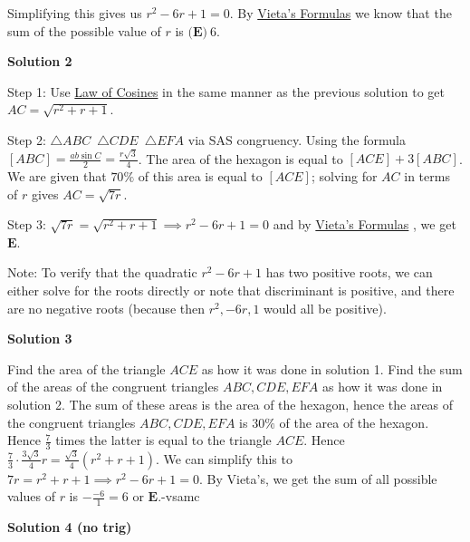 \begin{enumerate}
 Simplifying this gives us $r^2-6r+1 = 0$. By \href{https://artofproblemsolving.com/wiki/index.php?title=Vieta\%27s\_Formulas}{Vieta's Formulas} we know that the sum of the possible value of $r$ is $\boxed{\textbf{(E)}\ 6}$.

 



\textbf{Solution 2}

Step 1: Use \href{https://artofproblemsolving.com/wiki/index.php?title=Law\_of\_Cosines}{Law of Cosines} in the same manner as the previous solution to get $AC=\sqrt{r^2+r+1}$. 

 Step 2: $\triangle{ABC}$~$\triangle{CDE}$~$\triangle{EFA}$ via SAS congruency. Using the formula $[ABC]=\frac{ab \sin C}{2}= \frac{r \sqrt{3}}{4}$. The area of the hexagon is equal to $[ACE] + 3[ABC]$. We are given that $70\%$ of this area is equal to $[ACE]$; solving for $AC$ in terms of $r$ gives $AC=\sqrt{7r}$.

 Step 3: $\sqrt{7r}=\sqrt{r^2+r+1} \implies r^2-6r+1=0$ and by \href{https://artofproblemsolving.com/wiki/index.php?title=Vieta\%27s\_Formulas}{Vieta's Formulas} , we get $\boxed{\textbf{E}}$.

 Note: To verify that the quadratic $r^2-6r+1$ has two positive roots, we can either solve for the roots directly or note that discriminant is positive, and there are no negative roots (because then $r^2, -6r, 1$ would all be positive).

 



\textbf{Solution 3}

Find the area of the triangle $ACE$ as how it was done in solution 1. Find the sum of the areas of the congruent  triangles $ABC, CDE, EFA$ as how it was done in solution 2. The sum of these areas is the area of the hexagon, hence the areas of the congruent  triangles $ABC, CDE, EFA$ is $30\%$ of the area of the hexagon. Hence $\frac{7}{3}$ times the latter is equal to the triangle $ACE$. Hence $\frac{7}{3}\cdot\frac{3\sqrt{3}}{4}r=\frac{\sqrt{3}}{4}(r^2+r+1)$. We can simplify this to $7r=r^2+r+1\implies r^2-6r+1=0$. By Vieta's, we get the sum of all possible values of $r$ is $-\frac{-6}{1}=6\text{ or } \boxed{\textbf{E}}$.-vsamc

 



\textbf{Solution 4 (no trig)}



\end{enumerate}
